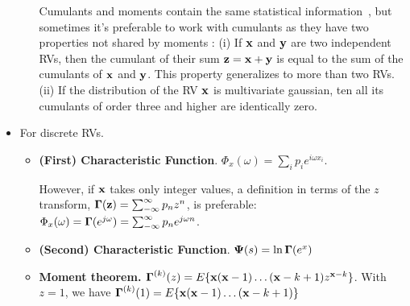 \documentclass[a4paper, oneside]{book}
\begin{document}
\begin{itemize}
\begin{itemize}
	Cumulants and moments contain the same statistical information~\cite{hyvarinen04}, but sometimes it's preferable to work with cumulants as they have two properties not shared by moments \cite{hyvarinen04}: (i) If $\mathbf {x}$ and $\mathbf y$ are two independent RVs, then the cumulant of their sum $\mathbf z = \mathbf{x+y}$ is equal to the sum of the cumulants of $\mathbf x$ and $\mathbf y$. This property generalizes to more than two RVs. (ii) If the distribution of the RV $\mathbf x$ is multivariate gaussian, ten all its cumulants of order three and higher are identically zero. 
	\end{itemize}	
	
\item For discrete RVs.
	\begin{itemize}
	\item \textbf{(First) Characteristic Function}. $\Phi_x(\omega) = \sum_i p_i e^{i \omega x_i}$.
	
	However, if $\mathbf x$ takes only integer values, a definition in terms of the $z$ transform, $\boldsymbol \Gamma(\mathbf z) = \sum_{-\infty}^\infty p_n z^n$, is preferable: $\Phi_x(\omega) = \boldsymbol{\Gamma}(e^{j\omega}) = \sum_{-\infty}^{\infty} p_n e^{j\omega n} $.
	
	\item \textbf{(Second) Characteristic Function}. $\boldsymbol{\Psi}(s) = \ln \boldsymbol\Gamma (e^x)$
	\item \textbf{Moment theorem.} $\boldsymbol \Gamma^{(k)}(z) = E\{\mathbf x(\mathbf x -1)\hdots(\mathbf x-k+1)z^{\mathbf x-k}\}$. With $z=1$, we have $\boldsymbol \Gamma^{(k)}(1) = E\{\mathbf x(\mathbf x -1)\hdots(\mathbf x-k+1)\}$
	\end{itemize}
\end{itemize}






















\end{document}
